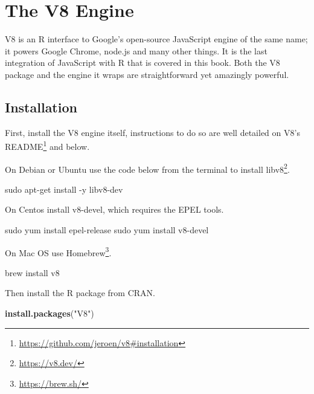 \documentclass[
  10pt,
]{krantz}
\makeatletter
\newenvironment{Shaded}{\begin{snugshade}}{\end{snugshade}}
\newcommand{\ExtensionTok}[1]{#1}
\newcommand{\FunctionTok}[1]{\textcolor[rgb]{0,0,0}{#1}}
\newcommand{\KeywordTok}[1]{\textcolor[rgb]{0.27,0.27,0.27}{\textbf{#1}}}
\newcommand{\NormalTok}[1]{#1}
\newcommand{\StringTok}[1]{\textcolor[rgb]{0.5,0.5,0.5}{#1}}
\renewcommand{\href}[2]{#2\footnote{\url{#1}}}
\newenvironment{kframe}{%
\medskip{}
\setlength{\fboxsep}{.8em}
 \def\at@end@of@kframe{}%
 \ifinner\ifhmode%
  \def\at@end@of@kframe{\end{minipage}}%
  \begin{minipage}{\columnwidth}%
 \fi\fi%
 \def\FrameCommand##1{\hskip\@totalleftmargin \hskip-\fboxsep
 \colorbox{shadecolor}{##1}\hskip-\fboxsep
     \hskip-\linewidth \hskip-\@totalleftmargin \hskip\columnwidth}%
 \MakeFramed {\advance\hsize-\width
   \@totalleftmargin\z@ \linewidth\hsize
   \@setminipage}}%
 {\par\unskip\endMakeFramed%
 \at@end@of@kframe}
\renewenvironment{Shaded}{\begin{kframe}}{\end{kframe}}
\makeatother
\begin{document}
\hypertarget{v8}{%
\chapter{The V8 Engine}\label{v8}}

V8 is an R interface to Google's open-source JavaScript engine of the same name; it powers Google Chrome, node.js and many other things. It is the last integration of JavaScript with R that is covered in this book. Both the V8 package and the engine it wraps are straightforward yet amazingly powerful.

\hypertarget{v8-installation}{%
\section{Installation}\label{v8-installation}}

First, install the V8 engine itself, instructions to do so are well detailed on \href{https://github.com/jeroen/v8\#installation}{V8's README} and below.

On Debian or Ubuntu use the code below from the terminal to install \href{https://v8.dev/}{libv8}.

\begin{Shaded}
\begin{Highlighting}[]
\FunctionTok{sudo}\NormalTok{ apt{-}get install {-}y libv8{-}dev}
\end{Highlighting}
\end{Shaded}

On Centos install v8-devel, which requires the EPEL tools.

\begin{Shaded}
\begin{Highlighting}[]
\FunctionTok{sudo}\NormalTok{ yum install epel{-}release}
\FunctionTok{sudo}\NormalTok{ yum install v8{-}devel}
\end{Highlighting}
\end{Shaded}

On Mac OS use \href{https://brew.sh/}{Homebrew}.

\begin{Shaded}
\begin{Highlighting}[]
\ExtensionTok{brew}\NormalTok{ install v8}
\end{Highlighting}
\end{Shaded}

Then install the R package from CRAN.

\begin{Shaded}
\begin{Highlighting}[]
\KeywordTok{install.packages}\NormalTok{(}\StringTok{"V8"}\NormalTok{)}
\end{Highlighting}
\end{Shaded}
\end{document}
